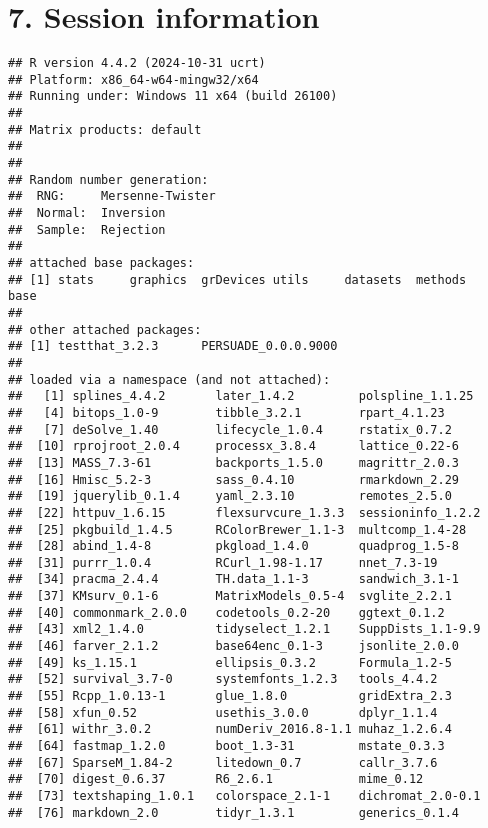 \documentclass[
]{article}
\begin{document}
\section{7. Session information}\label{session-information}

\begin{verbatim}
## R version 4.4.2 (2024-10-31 ucrt)
## Platform: x86_64-w64-mingw32/x64
## Running under: Windows 11 x64 (build 26100)
## 
## Matrix products: default
## 
## 
## Random number generation:
##  RNG:     Mersenne-Twister 
##  Normal:  Inversion 
##  Sample:  Rejection 
##  
## attached base packages:
## [1] stats     graphics  grDevices utils     datasets  methods   base     
## 
## other attached packages:
## [1] testthat_3.2.3      PERSUADE_0.0.0.9000
## 
## loaded via a namespace (and not attached):
##   [1] splines_4.4.2       later_1.4.2         polspline_1.1.25   
##   [4] bitops_1.0-9        tibble_3.2.1        rpart_4.1.23       
##   [7] deSolve_1.40        lifecycle_1.0.4     rstatix_0.7.2      
##  [10] rprojroot_2.0.4     processx_3.8.4      lattice_0.22-6     
##  [13] MASS_7.3-61         backports_1.5.0     magrittr_2.0.3     
##  [16] Hmisc_5.2-3         sass_0.4.10         rmarkdown_2.29     
##  [19] jquerylib_0.1.4     yaml_2.3.10         remotes_2.5.0      
##  [22] httpuv_1.6.15       flexsurvcure_1.3.3  sessioninfo_1.2.2  
##  [25] pkgbuild_1.4.5      RColorBrewer_1.1-3  multcomp_1.4-28    
##  [28] abind_1.4-8         pkgload_1.4.0       quadprog_1.5-8     
##  [31] purrr_1.0.4         RCurl_1.98-1.17     nnet_7.3-19        
##  [34] pracma_2.4.4        TH.data_1.1-3       sandwich_3.1-1     
##  [37] KMsurv_0.1-6        MatrixModels_0.5-4  svglite_2.2.1      
##  [40] commonmark_2.0.0    codetools_0.2-20    ggtext_0.1.2       
##  [43] xml2_1.4.0          tidyselect_1.2.1    SuppDists_1.1-9.9  
##  [46] farver_2.1.2        base64enc_0.1-3     jsonlite_2.0.0     
##  [49] ks_1.15.1           ellipsis_0.3.2      Formula_1.2-5      
##  [52] survival_3.7-0      systemfonts_1.2.3   tools_4.4.2        
##  [55] Rcpp_1.0.13-1       glue_1.8.0          gridExtra_2.3      
##  [58] xfun_0.52           usethis_3.0.0       dplyr_1.1.4        
##  [61] withr_3.0.2         numDeriv_2016.8-1.1 muhaz_1.2.6.4      
##  [64] fastmap_1.2.0       boot_1.3-31         mstate_0.3.3       
##  [67] SparseM_1.84-2      litedown_0.7        callr_3.7.6        
##  [70] digest_0.6.37       R6_2.6.1            mime_0.12          
##  [73] textshaping_1.0.1   colorspace_2.1-1    dichromat_2.0-0.1  
##  [76] markdown_2.0        tidyr_1.3.1         generics_0.1.4     

\end{verbatim}
\end{document}

